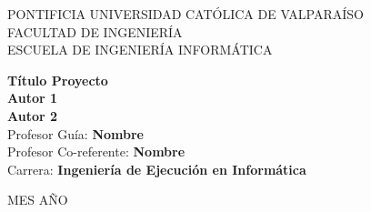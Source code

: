 
\newpage

\begin{center}
\large{PONTIFICIA UNIVERSIDAD CATÓLICA DE VALPARAÍSO\\FACULTAD DE INGENIERÍA\\ESCUELA DE INGENIERÍA INFORMÁTICA}
\end{center}

\vskip 0.9in

\begin{center}
\Large{\textbf{Título Proyecto}}
\vskip 0.4in
\Large{\textbf{\\Autor 1\\}}
\vskip 0.2in
\Large{\textbf{Autor 2\\}}
\vskip 0.9in
\Large{Profesor Guía: \textbf{Nombre\\}}
\vskip 0.2in
\Large{Profesor Co-referente: \textbf{Nombre}\\}
\vskip 0.2in
\Large{Carrera: \textbf{Ingeniería de Ejecución en Informática}}
\end{center}

\vskip 2.5in
\begin{center} \large{MES AÑO} \end{center}
\pagestyle{empty}

